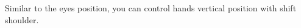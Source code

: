\documentclass[preview]{standalone}
\begin{document}
\begin{center}
Similar to the eyes position, you can control hands vertical position with shift shoulder.
\end{center}
\end{document}
